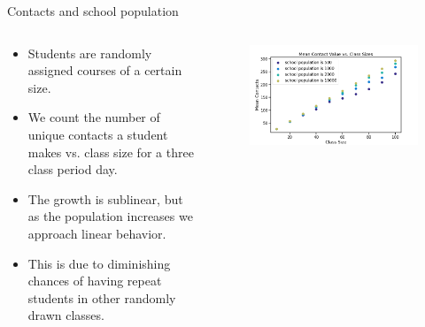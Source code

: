 \documentclass[aspectratio=169]{beamer}
\begin{document}
\begin{frame}{Contacts and school population}
    \vfill
    \begin{columns}
    \begin{column}{.4\textwidth}
        \begin{itemize}

            \item Students are randomly assigned courses of a certain size.

            \item We count the number of unique contacts a student makes vs. class size for a three class period day.

            \item The growth is sublinear, but as the population increases we approach linear behavior.

            \item This is due to diminishing chances of having repeat students in other randomly drawn classes.
        \end{itemize}
    \end{column}
    \begin{column}{.6\textwidth}
        \begin{figure}[H]
            \centering
            \includegraphics[width=\textwidth]{figures/contacts_vs_population.png}
        \end{figure}
    \end{column}
    \end{columns}
    \vfill
\end{frame}
\end{document}
